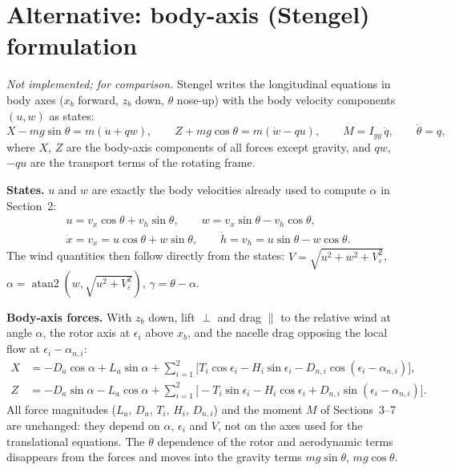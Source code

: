 \documentclass[10pt,a4paper]{article}
\begin{document}
\section{Alternative: body-axis (Stengel) formulation}

\emph{Not implemented; for comparison.} Stengel writes the longitudinal equations in body axes ($x_b$ forward,
$z_b$ down, $\theta$ nose-up) with the body velocity components $(u, w)$ as states:
\begin{equation}
X - mg\sin\theta = m(\dot u + q w), \qquad
Z + mg\cos\theta = m(\dot w - q u), \qquad
M = I_{yy}\,\dot q, \qquad \dot\theta = q,
\end{equation}
where $X$, $Z$ are the body-axis components of all forces except gravity, and $qw$, $-qu$ are the
transport terms of the rotating frame.

\textbf{States.} $u$ and $w$ are exactly the body velocities already used to compute $\alpha$ in Section~2:
\begin{gather}
u = v_x\cos\theta + v_h\sin\theta, \qquad w = v_x\sin\theta - v_h\cos\theta, \\
\dot x = v_x = u\cos\theta + w\sin\theta, \qquad \dot h = v_h = u\sin\theta - w\cos\theta . \label{eq:body_kin}
\end{gather}
The wind quantities then follow directly from the states:
$V = \sqrt{u^2 + w^2 + V_\varepsilon^2}$, $\alpha = \operatorname{atan2}(w, \sqrt{u^2 + V_\varepsilon^2})$, $\gamma = \theta - \alpha$.

\textbf{Body-axis forces.} With $z_b$ down, lift $\perp$ and drag $\parallel$ to the relative wind at angle $\alpha$, the rotor axis
at $\epsilon_i$ above $x_b$, and the nacelle drag opposing the local flow at $\epsilon_i - \alpha_{n,i}$:
\begin{align}
X &= -D_a\cos\alpha + L_a\sin\alpha
 + \sum_{i=1}^{2}\Big[ T_i\cos\epsilon_i - H_i\sin\epsilon_i - D_{n,i}\cos(\epsilon_i-\alpha_{n,i}) \Big], \\
Z &= -D_a\sin\alpha - L_a\cos\alpha
 + \sum_{i=1}^{2}\Big[ -T_i\sin\epsilon_i - H_i\cos\epsilon_i + D_{n,i}\sin(\epsilon_i-\alpha_{n,i}) \Big].
\end{align}
All force magnitudes ($L_a$, $D_a$, $T_i$, $H_i$, $D_{n,i}$) and the moment $M$ of Sections~3--7 are unchanged: they depend
on $\alpha$, $\epsilon_i$ and $V$, not on the axes used for the translational equations.
The $\theta$ dependence of the rotor and aerodynamic terms disappears from the forces and moves into the gravity
terms $mg\sin\theta$, $mg\cos\theta$.
\end{document}
